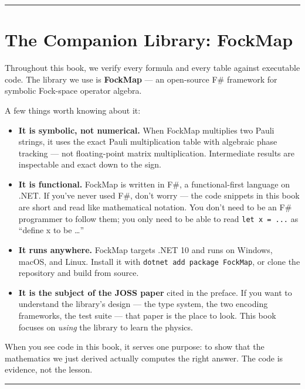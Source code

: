 \documentclass[
  11pt,
  oneside]{book}
\begin{document}
\begin{center}\rule{0.5\linewidth}{0.5pt}\end{center}

\section{The Companion Library:
FockMap}\label{the-companion-library-fockmap}

Throughout this book, we verify every formula and every table against
executable code. The library we use is \textbf{FockMap} --- an
open-source F\# framework for symbolic Fock-space operator algebra.

A few things worth knowing about it:

\begin{itemize}
\item
  \textbf{It is symbolic, not numerical.} When FockMap multiplies two
  Pauli strings, it uses the exact Pauli multiplication table with
  algebraic phase tracking --- not floating-point matrix multiplication.
  Intermediate results are inspectable and exact down to the sign.
\item
  \textbf{It is functional.} FockMap is written in F\#, a
  functional-first language on .NET. If you've never used F\#, don't
  worry --- the code snippets in this book are short and read like
  mathematical notation. You don't need to be an F\# programmer to
  follow them; you only need to be able to read \texttt{let\ x\ =\ ...}
  as ``define x to be \ldots{}''
\item
  \textbf{It runs anywhere.} FockMap targets .NET 10 and runs on
  Windows, macOS, and Linux. Install it with
  \texttt{dotnet\ add\ package\ FockMap}, or clone the repository and
  build from source.
\item
  \textbf{It is the subject of the JOSS paper} cited in the preface. If
  you want to understand the library's design --- the type system, the
  two encoding frameworks, the test suite --- that paper is the place to
  look. This book focuses on \emph{using} the library to learn the
  physics.
\end{itemize}

When you see code in this book, it serves one purpose: to show that the
mathematics we just derived actually computes the right answer. The code
is evidence, not the lesson.

\begin{center}\rule{0.5\linewidth}{0.5pt}\end{center}
\end{document}
